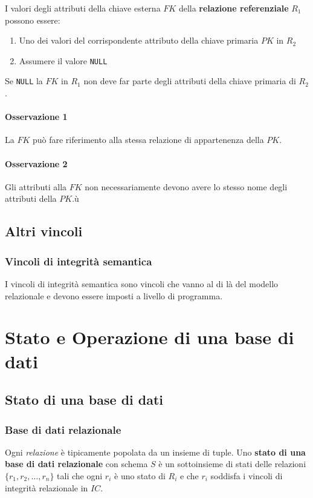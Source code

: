         I valori degli attributi della chiave esterna $ FK $ della \textbf{relazione referenziale} $ R_1 $ possono essere:
            \begin{enumerate}
                \item Uno dei valori del corrispondente attributo della chiave primaria $ PK $ in $ R_2 $
                \item Assumere il valore \texttt{NULL}
            \end{enumerate}
        Se \texttt{NULL} la $ FK $ in $ R_1 $ non deve far parte degli attributi della chiave primaria di $ R_2 $.

        \paragraph{Osservazione 1} La $ FK $ può fare riferimento alla stessa relazione di appartenenza della $ PK $.
        \paragraph{Osservazione 2} Gli attributi alla $ FK $ non necessariamente devono avere lo stesso nome degli attributi della $ PK $.ù
    \subsection{Altri vincoli}
        \subsubsection{Vincoli di integrità semantica}
            I vincoli di integrità semantica sono vincoli che vanno al di là del modello relazionale e devono essere imposti a livello di programma.
\section{Stato e Operazione di una base di dati}
    \subsection{Stato di una base di dati}
        \subsubsection{Base di dati relazionale}
            Ogni \textit{relazione} è tipicamente popolata da un insieme di tuple. Uno \textbf{stato di una base di dati relazionale} con schema $ S $ è un sottoinsieme di stati delle relazioni $ \{ r_1, r_2, \dots, r_n \} $ tali che ogni $ r_i $ è uno stato di $ R_i $ e che $ r_i $ soddisfa i vincoli di integrità relazionale in $ IC $.

